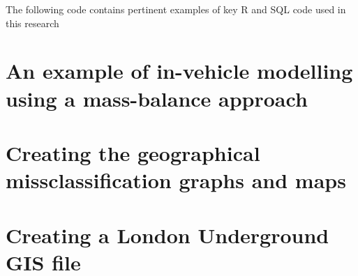 The following code contains pertinent examples of key R and SQL code used in this research

\section{An example of in-vehicle modelling using a mass-balance approach}
\label{code:in_vehicle_example}


\section{Creating the geographical missclassification graphs and maps}
\label{code:create_geographical_results}


\section{Creating a London Underground GIS file}
\label{code:make_tube_network_from_scratch}


